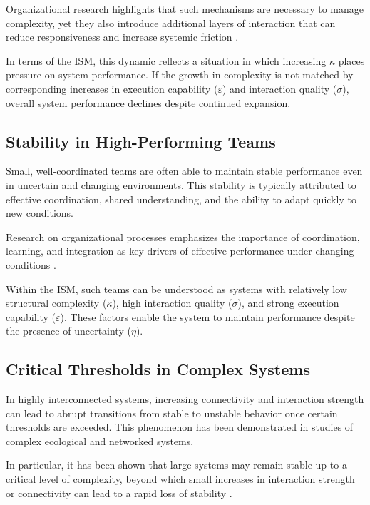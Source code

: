 \documentclass[11pt,a4paper]{article}
\theoremstyle{definition}
\begin{document}
Organizational research highlights that such mechanisms are necessary to manage complexity, yet they also introduce additional layers of interaction that can reduce responsiveness and increase systemic friction \parencite{march1958,simon1962}.

In terms of the \ac{ISM}, this dynamic reflects a situation in which increasing $\kappa$ places pressure on system performance.
If the growth in complexity is not matched by corresponding increases in execution capability ($\varepsilon$) and interaction quality ($\sigma$), overall system performance declines despite continued expansion.

\subsection{Stability in High-Performing Teams}
\label{subsec:example_team}

Small, well-coordinated teams are often able to maintain stable performance even in uncertain and changing environments.
This stability is typically attributed to effective coordination, shared understanding, and the ability to adapt quickly to new conditions.

Research on organizational processes emphasizes the importance of coordination, learning, and integration as key drivers of effective performance under changing conditions \parencite{teece1997}.

Within the \ac{ISM}, such teams can be understood as systems with relatively low structural complexity ($\kappa$), high interaction quality ($\sigma$), and strong execution capability ($\varepsilon$).
These factors enable the system to maintain performance despite the presence of uncertainty ($\eta$).

\subsection{Critical Thresholds in Complex Systems}
\label{subsec:example_network}

In highly interconnected systems, increasing connectivity and interaction strength can lead to abrupt transitions from stable to unstable behavior once certain thresholds are exceeded.
This phenomenon has been demonstrated in studies of complex ecological and networked systems.

In particular, it has been shown that large systems may remain stable up to a critical level of complexity, beyond which small increases in interaction strength or connectivity can lead to a rapid loss of stability \parencite{may1972}.
\end{document}
